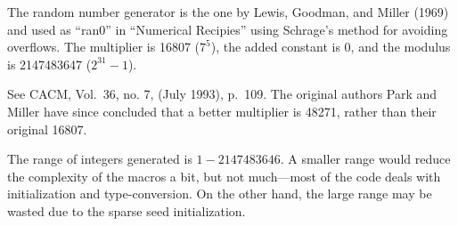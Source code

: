 The random number generator is the one by Lewis, Goodman, and Miller
(1969) and used as ``ran0'' in ``Numerical Recipies'' using Schrage's
method for avoiding overflows.  The multiplier is 16807 ($7^5$), the
added constant is 0, and the modulus is 2147483647 ($2^{31}-1$).

See CACM, Vol.~36, no. 7, (July 1993), p.~109.  The original authors 
Park and Miller have since concluded that a better multiplier is 48271,
rather than their original 16807.

The range of integers generated is $1 - 2147483646$.  A smaller range would
reduce the complexity of the macros a bit, but not much---most of the
code deals with initialization and type-conversion.  On the other hand,
the large range may be wasted due to the sparse seed initialization.


\bye
